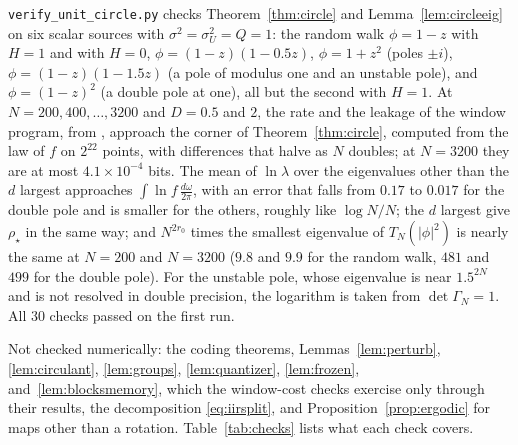 \documentclass[11pt,onecolumn]{IEEEtran}
\newcommand{\dw}{\tfrac{d\omega}{2\pi}}
\begin{document}
\texttt{verify\_unit\_circle.py} checks Theorem~\ref{thm:circle} and
Lemma~\ref{lem:circleeig} on six scalar sources with $\sigma^2=\sigma_U^2=Q=1$:
the random walk $\phi=1-z$ with $H=1$ and with $H=0$,
$\phi=(1-z)(1-0.5z)$, $\phi=1+z^2$ (poles $\pm i$), $\phi=(1-z)(1-1.5z)$ (a
pole of modulus one and an unstable pole), and $\phi=(1-z)^2$ (a double
pole at one), all but the second with $H=1$. At $N=200,400,\dots,3200$ and
$D=0.5$ and $2$, the rate and the leakage of the window program, from
\cite[Lemma~24]{part3}, approach the corner of Theorem~\ref{thm:circle},
computed from the law of $f$ on $2^{22}$ points, with differences that
halve as $N$ doubles; at $N=3200$ they are at most $4.1\times10^{-4}$ bits.
The mean of $\ln\lambda$ over the eigenvalues other than the $d$ largest
approaches $\int\ln f\,\dw$, with an error that falls from $0.17$ to
$0.017$ for the double pole and is smaller for the others, roughly like
$\log N/N$; the $d$ largest give $\rho_\star$ in the same way; and
$N^{2r_0}$ times the smallest eigenvalue of $T_N(|\phi|^2)$ is nearly the
same at $N=200$ and $N=3200$ ($9.8$ and $9.9$ for the random walk, $481$
and $499$ for the double pole). For the unstable pole, whose eigenvalue
is near $1.5^{2N}$ and is not resolved in double precision, the
logarithm is taken from $\det\Gamma_N=1$. All $30$ checks passed on the
first run.

Not checked numerically: the coding theorems, Lemmas~\ref{lem:perturb},
\ref{lem:circulant}, \ref{lem:groups}, \ref{lem:quantizer},
\ref{lem:frozen}, and~\ref{lem:blocksmemory}, which the window-cost
checks exercise only through their results, the decomposition
\eqref{eq:iirsplit}, and Proposition~\ref{prop:ergodic} for maps other
than a rotation.
Table~\ref{tab:checks} lists what each check covers.
\end{document}

